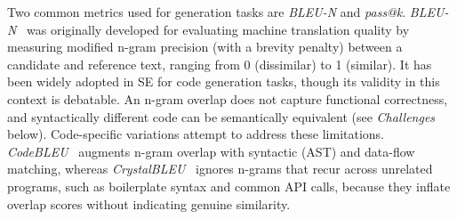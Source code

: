 \documentclass[smallextended]{svjour3}
\begin{document}
Two common metrics used for generation tasks are \emph{BLEU-N} and \emph{pass@k}.
\emph{BLEU-N}~\cite{DBLP:conf/acl/PapineniRWZ02} was originally developed for evaluating machine translation quality by measuring modified n-gram precision (with a brevity penalty) between a candidate and reference text, ranging from 0 (dissimilar) to 1 (similar). It has been widely adopted in SE for code generation tasks, though its validity in this context is debatable. An n-gram overlap does not capture functional correctness, and syntactically different code can be semantically equivalent (see \emph{Challenges} below).
Code-specific variations attempt to address these limitations. \emph{CodeBLEU}~\cite{DBLP:journals/corr/abs-2009-10297} augments n-gram overlap with syntactic (AST) and data-flow matching, whereas \emph{CrystalBLEU}~\cite{DBLP:conf/kbse/EghbaliP22} ignores n-grams that recur across unrelated programs, such as boilerplate syntax and common API calls, because they inflate overlap scores without indicating genuine similarity.
\end{document}
